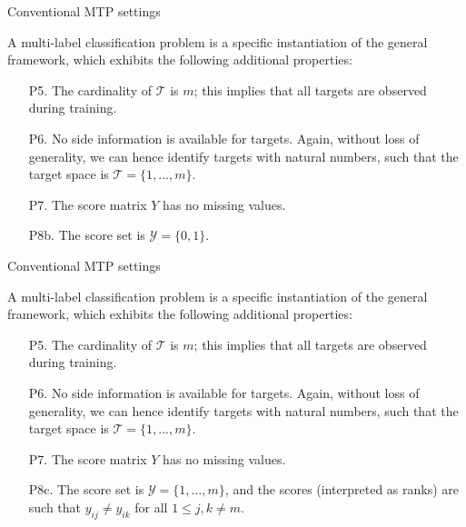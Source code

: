 \documentclass[]{beamer}
\begin{document}
\begin{frame}{Conventional MTP settings}
\begin{definition} 
A multi-label classification problem is a specific instantiation of the general framework, which exhibits the following additional properties: 
\begin{enumerate}
\item[P5.] The cardinality of $\mathcal{T}$ is $m$; this implies that all targets are observed during training. 
\item[P6.] No side information is available for targets. Again, without loss of generality, we can hence identify targets with natural numbers, such that the target space is $\mathcal{T} = \{1,...,m\}$. 
\item[P7.] The score matrix $Y$ has no missing values. 
\item[P8b.] The score set is $\mathcal{Y} = \{0,1\}$. 
\end{enumerate}
\end{definition}
\end{frame}


\begin{frame}{Conventional MTP settings}
\begin{definition} 
A multi-label classification problem is a specific instantiation of the general framework, which exhibits the following additional properties: 
\begin{enumerate}
\item[P5.] The cardinality of $\mathcal{T}$ is $m$; this implies that all targets are observed during training. 
\item[P6.] No side information is available for targets. Again, without loss of generality, we can hence identify targets with natural numbers, such that the target space is $\mathcal{T} = \{1,...,m\}$. 
\item[P7.] The score matrix $Y$ has no missing values. 
\item[P8c.] The score set is $\mathcal{Y} = \{1, \ldots , m\}$, and the scores (interpreted as ranks) are such that $y_{ij} \neq y_{ik}$ for all $1 \leq j,k \neq m$. 
\end{enumerate}
\end{definition}
\end{frame}
\end{document}
